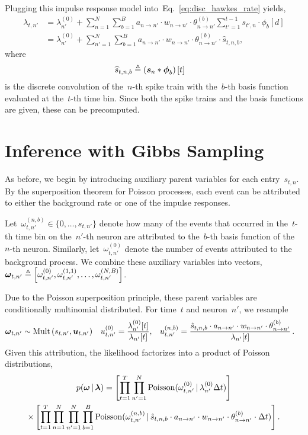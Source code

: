 Plugging this impulse response model
into~Eq.~\ref{eq:disc_hawkes_rate} yields,
\begin{align*}
  \lambda_{t,n'} &=
  \lambda_{n'}^{(0)} +
  \sum_{n = 1}^N  \sum_{b=1}^B a_{n \to n'} \cdot w_{n \to n'} \cdot 
  \theta_{n \to n'}^{(b)} \sum_{t'=1}^{t-1} s_{t',n} \cdot \phi_b[d] \\
  &=
  \lambda_{n'}^{(0)} +
  \sum_{n' = 1}^N  \sum_{b=1}^B a_{n \to n'} \cdot w_{n \to n'} \cdot
  \theta_{n \to n'}^{(b)} \cdot  \widehat{s}_{t,n,b},
\end{align*}
where
\begin{align*}
  \widehat{s}_{t,n,b} &\triangleq \left(\boldsymbol{s}_n \ast \boldsymbol{\phi}_b\right)[t]
\end{align*}
is the discrete convolution of the~$n$-th spike train with
the~$b$-th basis function evaluated at the~$t$-th time bin.
Since both the spike trains and the basis functions are given,
these can be precomputed.


\section{Inference with Gibbs Sampling}

As before, we begin by introducing auxiliary parent variables for each
entry~$s_{t,n}$.  By the superposition theorem for Poisson processes,
each event can be attributed to either the background rate or one of
the impulse responses.

Let~${\omega_{t,n'}^{(n,b)} \in \{0,\ldots, s_{t,n'}\}}$ denote how
many of the events that occurred in the~$t$-th time bin on the~$n'$-th
neuron are attributed to the~$b$-th basis function of the~$n$-th
neuron.  Similarly, let~${\omega_{t,n'}^{(0)}}$ denote the number of
events attributed to the background process. We combine these
auxiliary variables into vectors,~${\boldsymbol{\omega}_{t,n'}\triangleq
  \left[\omega_{t,n'}^{(0)}, \omega_{t,n'}^{(1,1)}, \ldots,
    \omega_{t,n'}^{(N,B)} \right]}$.

Due to the Poisson superposition principle, these parent variables are
conditionally multinomial distributed.  For time~$t$ and neuron~$n'$,
we resample
\begin{align*}
\boldsymbol{\omega}_{t,n'} &\sim \mathrm{Mult} \left(s_{t,n'}, \boldsymbol{u}_{t,n'} \right) & 
u_{t,n'}^{(0)} &= \frac{\lambda_{n'}^{(0)}[t]}{\lambda_{n'}[t]}, &
u_{t,n'}^{(n,b)} &= \frac{\hat{s}_{t,n,b} \cdot a_{n \to n'} \cdot w_{n \to n'} \cdot \theta_{n \to n'}^{(b)}}{\lambda_{n'}[t]}\, .
\end{align*}
Given this attribution, the likelihood factorizes into a product of
Poisson distributions,
\begin{multline*}
  p(\boldsymbol{\omega} \,|\, \boldsymbol{\lambda}) =
  \left[\prod_{t=1}^T \prod_{n'=1}^N \mathrm{Poisson}(\omega_{t,n'}^{(0)} \,|\, \lambda_{n'}^{(0)} \Delta t)\right]  \\
  \times
  \left[ \prod_{t=1}^T \prod_{n=1}^N \prod_{n'=1}^N \prod_{b=1}^B
    \mathrm{Poisson}(\omega_{t,n'}^{(n,b)} \,|\,
    \hat{s}_{t,n,b} \cdot a_{n \to n'} \cdot w_{n \to n'} \cdot \theta_{n\to n'}^{(b)} \cdot \Delta t)\right].
\end{multline*}

